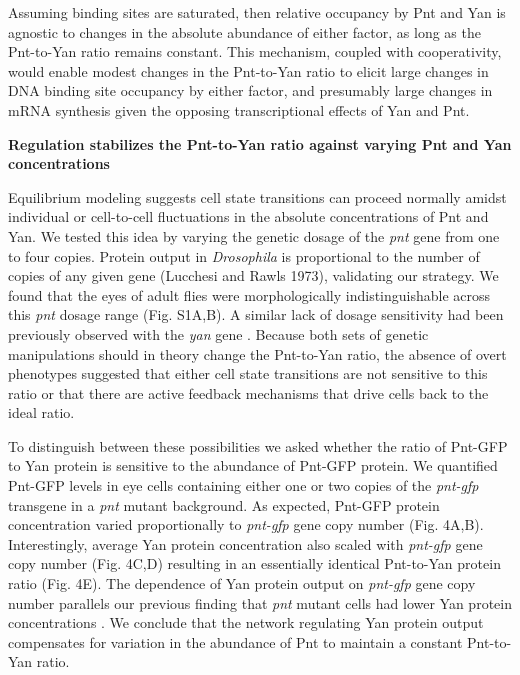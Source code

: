 Assuming binding sites are saturated, then relative occupancy by Pnt and Yan is agnostic to changes in the absolute abundance of either factor, as long as the Pnt-to-Yan ratio remains constant. This mechanism, coupled with cooperativity, would enable modest changes in the Pnt-to-Yan ratio to elicit large changes in DNA binding site occupancy by either factor, and presumably large changes in mRNA synthesis given the opposing transcriptional effects of Yan and Pnt.

\textbf{Regulation stabilizes the Pnt-to-Yan ratio against varying Pnt and Yan concentrations}

Equilibrium modeling suggests cell state transitions can proceed normally amidst individual or cell-to-cell fluctuations in the absolute concentrations of Pnt and Yan. We tested this idea by varying the genetic dosage of the \textit{pnt} gene from one to four copies. Protein output in \textit{Drosophila} is proportional to the number of copies of any given gene (Lucchesi and Rawls 1973), validating our strategy. We found that the eyes of adult flies were morphologically indistinguishable across this \textit{pnt} dosage range (Fig. S1A,B). A similar lack of dosage sensitivity had been previously observed with the \textit{yan} gene \cite{Pelaez2015}. Because both sets of genetic manipulations should in theory change the Pnt-to-Yan ratio, the absence of overt phenotypes suggested that either cell state transitions are not sensitive to this ratio or that there are active feedback mechanisms that drive cells back to the ideal ratio.

To distinguish between these possibilities we asked whether the ratio of Pnt-GFP to Yan protein is sensitive to the abundance of Pnt-GFP protein. We quantified Pnt-GFP levels in eye cells containing either one or two copies of the \textit{pnt-gfp} transgene in a \textit{pnt} mutant background. As expected, Pnt-GFP protein concentration varied proportionally to \textit{pnt-gfp} gene copy number (Fig. 4A,B). Interestingly, average Yan protein concentration also scaled with \textit{pnt-gfp} gene copy number (Fig. 4C,D) resulting in an essentially identical Pnt-to-Yan protein ratio (Fig. 4E). The dependence of Yan protein output on \textit{pnt-gfp} gene copy number parallels our previous finding that \textit{pnt} mutant cells had lower Yan protein concentrations \cite{Pelaez2015}. We conclude that the network regulating Yan protein output compensates for variation in the abundance of Pnt to maintain a constant Pnt-to-Yan ratio.

